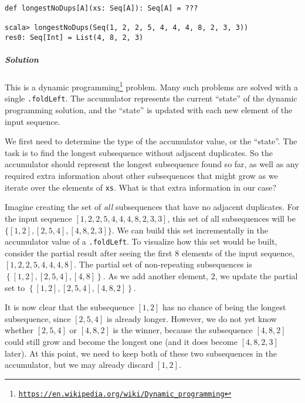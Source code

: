 \begin{lstlisting}
def longestNoDups[A](xs: Seq[A]): Seq[A] = ???

scala> longestNoDups(Seq(1, 2, 2, 5, 4, 4, 4, 8, 2, 3, 3))
res0: Seq[Int] = List(4, 8, 2, 3)
\end{lstlisting}


\subparagraph{Solution}

This is a dynamic programming\footnote{\texttt{\href{https://en.wikipedia.org/wiki/Dynamic_programming}{https://en.wikipedia.org/wiki/Dynamic\_programming}}}
problem. Many such problems are solved with a single \lstinline!.foldLeft!.
The accumulator represents the current ``state'' of the dynamic
programming solution, and the ``state'' is updated with each new
element of the input sequence.

We first need to determine the type of the accumulator value, or the
``state''. The task is to find the longest subsequence without adjacent
duplicates. So the accumulator should represent the longest subsequence
found so far, as well as any required extra information about other
subsequences that might grow as we iterate over the elements of \lstinline!xs!.
What is that extra information in our case? 

Imagine creating the set of \emph{all} subsequences that have no adjacent
duplicates. For the input sequence $\left[1,2,2,5,4,4,4,8,2,3,3\right]$,
this set of all subsequences will be $\{\left[1,2\right],\left[2,5,4\right],\left[4,8,2,3\right]\}$.
We can build this set incrementally in the accumulator value of a
\lstinline!.foldLeft!. To visualize how this set would be built,
consider the partial result after seeing the first $8$ elements of
the input sequence, $\left[1,2,2,5,4,4,4,8\right]$. The partial set
of non-repeating subsequences is $\left\{ \left[1,2\right],\left[2,5,4\right],\left[4,8\right]\right\} $.
As we add another element, $2$, we update the partial set to $\left\{ \left[1,2\right],\left[2,5,4\right],\left[4,8,2\right]\right\} $.

It is now clear that the subsequence $\left[1,2\right]$ has no chance
of being the longest subsequence, since $\left[2,5,4\right]$ is already
longer. However, we do not yet know whether $\left[2,5,4\right]$
or $\left[4,8,2\right]$ is the winner, because the subsequence $\left[4,8,2\right]$
could still grow and become the longest one (and it does become $\left[4,8,2,3\right]$
later). At this point, we need to keep both of these two subsequences
in the accumulator, but we may already discard $\left[1,2\right]$.

